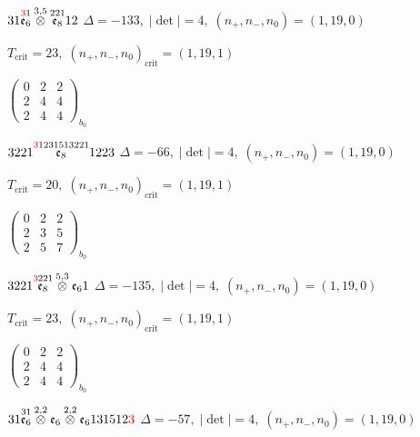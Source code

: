 \documentclass[10pt]{article}
\begin{document}
$31\overset{\textcolor{red}{3}1}{\mathfrak{e}_6}\overset{3,5}{\otimes}\overset{221}{\mathfrak{e}_8}12$ \quad $\Delta=-133,\; |\det|=4,\; (n_+,n_-,n_0)=(1,19,0)$

\hspace{1em}$T_{\text{crit}}=23,\; (n_+,n_-,n_0)_{\text{crit}}=(1,19,1)$

\hspace{2em}$\left(\begin{smallmatrix}0 & 2 & 2 \\ 2 & 4 & 4 \\ 2 & 4 & 4\end{smallmatrix}\right)_{\!b_0}$

\smallskip

$3221\overset{\textcolor{red}{3}1231513221}{\mathfrak{e}_8}1223$ \quad $\Delta=-66,\; |\det|=4,\; (n_+,n_-,n_0)=(1,19,0)$

\hspace{1em}$T_{\text{crit}}=20,\; (n_+,n_-,n_0)_{\text{crit}}=(1,19,1)$

\hspace{2em}$\left(\begin{smallmatrix}0 & 2 & 2 \\ 2 & 3 & 5 \\ 2 & 5 & 7\end{smallmatrix}\right)_{\!b_0}$

\smallskip

$3221\overset{\textcolor{red}{3}221}{\mathfrak{e}_8}\overset{5,3}{\otimes}\mathfrak{e}_61$ \quad $\Delta=-135,\; |\det|=4,\; (n_+,n_-,n_0)=(1,19,0)$

\hspace{1em}$T_{\text{crit}}=23,\; (n_+,n_-,n_0)_{\text{crit}}=(1,19,1)$

\hspace{2em}$\left(\begin{smallmatrix}0 & 2 & 2 \\ 2 & 4 & 4 \\ 2 & 4 & 4\end{smallmatrix}\right)_{\!b_0}$

\smallskip

$31\overset{31}{\mathfrak{e}_6}\overset{2,2}{\otimes}\mathfrak{e}_6\overset{2,2}{\otimes}\mathfrak{e}_6131512\textcolor{red}{3}$ \quad $\Delta=-57,\; |\det|=4,\; (n_+,n_-,n_0)=(1,19,0)$
\end{document}
